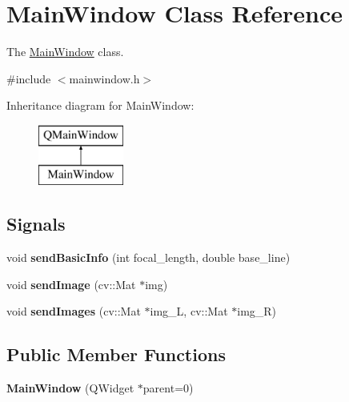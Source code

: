 \hypertarget{class_main_window}{}\section{Main\+Window Class Reference}
\label{class_main_window}


The \hyperlink{class_main_window}{Main\+Window} class.  




{\ttfamily \#include $<$mainwindow.\+h$>$}

Inheritance diagram for Main\+Window\+:\begin{figure}[H]
\begin{center}
\leavevmode
\includegraphics[height=2.000000cm]{class_main_window}
\end{center}
\end{figure}
\subsection*{Signals}
\begin{DoxyCompactItemize}
\item 
\hypertarget{class_main_window_a166aeaf752a430f7468b205c9b514b25}{}void {\bfseries send\+Basic\+Info} (int focal\+\_\+length, double base\+\_\+line)\label{class_main_window_a166aeaf752a430f7468b205c9b514b25}

\item 
\hypertarget{class_main_window_a0f8dabec720e115a310c35407bef31db}{}void {\bfseries send\+Image} (cv\+::\+Mat $\ast$img)\label{class_main_window_a0f8dabec720e115a310c35407bef31db}

\item 
\hypertarget{class_main_window_ada48458b0cdedebe20094d9888e955b0}{}void {\bfseries send\+Images} (cv\+::\+Mat $\ast$img\+\_\+\+L, cv\+::\+Mat $\ast$img\+\_\+\+R)\label{class_main_window_ada48458b0cdedebe20094d9888e955b0}

\end{DoxyCompactItemize}
\subsection*{Public Member Functions}
\begin{DoxyCompactItemize}
\item 
\hypertarget{class_main_window_a8b244be8b7b7db1b08de2a2acb9409db}{}{\bfseries Main\+Window} (Q\+Widget $\ast$parent=0)\label{class_main_window_a8b244be8b7b7db1b08de2a2acb9409db}

\end{DoxyCompactItemize}
